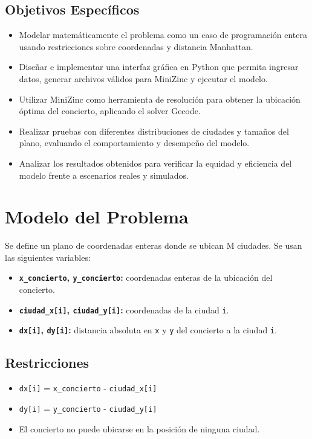 \documentclass[conference]{IEEEtran}
\begin{document}
\subsection{Objetivos Específicos}
\begin{itemize}
	\item
	Modelar matemáticamente el problema como un caso de programación
	entera usando restricciones sobre coordenadas y distancia Manhattan.
	\item
	Diseñar e implementar una interfaz gráfica en Python que permita
	ingresar datos, generar archivos válidos para MiniZinc y ejecutar el
	modelo.
	\item
	Utilizar MiniZinc como herramienta de resolución para obtener la
	ubicación óptima del concierto, aplicando el solver Gecode.
	\item
	Realizar pruebas con diferentes distribuciones de ciudades y tamaños
	del plano, evaluando el comportamiento y desempeño del modelo.
	\item
	Analizar los resultados obtenidos para verificar la equidad y
	eficiencia del modelo frente a escenarios reales y simulados.
\end{itemize}

\section{Modelo del Problema}
Se define un plano de coordenadas enteras donde se ubican M ciudades. Se
usan las siguientes variables:

\begin{itemize}
	\item
	\textbf{\texttt{x\_concierto}, \texttt{y\_concierto}:} coordenadas enteras de la ubicación del
	concierto.
	\item
	\textbf{\texttt{ciudad\_x[i]}, \texttt{ciudad\_y[i]}:} coordenadas de la ciudad \texttt{i}.
	\item
	\textbf{\texttt{dx[i]}, \texttt{dy[i]}:} distancia absoluta en \texttt{x} y \texttt{y} del concierto a la
	ciudad \texttt{i}.
\end{itemize}

\subsection{Restricciones}

\begin{itemize}
	\item
	\texttt{dx[i]} = \textbar \texttt{x\_concierto} - \texttt{ciudad\_x[i]}\textbar
	\item
	\texttt{dy[i]} = \textbar \texttt{y\_concierto} - \texttt{ciudad\_y[i]}\textbar
	\item
	El concierto no puede ubicarse en la posición de ninguna ciudad.
\end{itemize}
\end{document}
